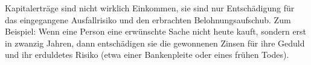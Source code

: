 Kapitalerträge sind nicht wirklich Einkommen, sie sind nur Entschädigung für das eingegangene Ausfallrisiko und den erbrachten Belohnungsaufschub.
Zum Beispiel: Wenn eine Person eine erwünschte Sache nicht heute kauft, sondern erst in zwanzig Jahren, dann entschädigen sie die gewonnenen Zinsen für ihre Geduld und ihr erduldetes Risiko (etwa einer Bankenpleite oder eines frühen Todes).